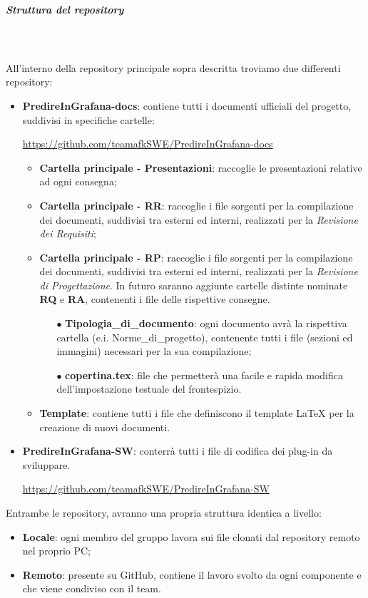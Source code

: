 \subparagraph{Struttura del repository} \mbox{} \\ \mbox{} \\
All'interno della repository principale sopra descritta troviamo due differenti repository: \begin{itemize}
\item \textbf{PredireInGrafana-docs}: contiene tutti i documenti ufficiali del progetto, suddivisi in specifiche cartelle: \\
\centerline{\url{https://github.com/teamafkSWE/PredireInGrafana-docs}}  \begin{itemize}
\item \textbf{Cartella principale - Presentazioni}: raccoglie le presentazioni relative ad ogni consegna;
\item \textbf{Cartella principale - RR}: raccoglie i file sorgenti per la compilazione dei documenti, suddivisi tra esterni ed interni, realizzati per la \textit{Revisione dei Requisiti};
\item \textbf{Cartella principale - RP}: raccoglie i file sorgenti per la compilazione dei documenti, suddivisi tra esterni ed interni, realizzati per la \textit{Revisione di Progettazione}. In futuro saranno aggiunte cartelle distinte nominate \textbf{RQ} e \textbf{RA}, contenenti i file delle rispettive consegne.
\begin{itemize}
\item[$\bullet$] \textbf{Tipologia\_di\_documento}: ogni documento avrà la rispettiva cartella (e.i. Norme\_di\_progetto), contenente tutti i file (sezioni ed immagini) necessari per la sua compilazione;
\item[$\bullet$] \textbf{copertina.tex}: file che permetterà una facile e rapida modifica dell'impostazione testuale del frontespizio.
\end{itemize}
\item \textbf{Template}: contiene tutti i file che definiscono il template \LaTeX{} per la creazione di nuovi documenti.
\end{itemize} 
\item \textbf{PredireInGrafana-SW}: conterrà tutti i file di codifica dei plug-in da sviluppare. \\ \centerline{\url{https://github.com/teamafkSWE/PredireInGrafana-SW}}
\end{itemize}
Entrambe le repository, avranno una propria struttura identica a livello: \begin{itemize}
\item \textbf{Locale}: ogni membro del gruppo lavora sui file clonati dal repository remoto nel proprio PC;
\item \textbf{Remoto}: presente su GitHub, contiene il lavoro svolto da ogni componente e che viene condiviso con il team.
\end{itemize}

